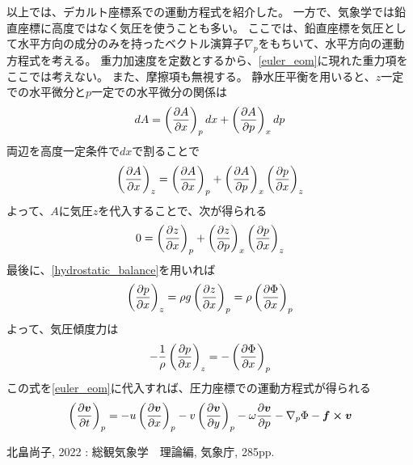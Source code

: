 \documentclass[a4paper,11pt,platex]{jsarticle}
\numberwithin{equation}{section}
\newcommand{\spartial}[2]{{\partial #1 \over \partial #2}}
\begin{document}
以上では、デカルト座標系での運動方程式を紹介した。
一方で、気象学では鉛直座標に高度ではなく気圧を使うことも多い。
ここでは、鉛直座標を気圧として水平方向の成分のみを持ったベクトル演算子$\nabla_p$をもちいて、水平方向の運動方程式を考える。
重力加速度を定数とするから、\autoref{euler_eom}に現れた重力項をここでは考えない。
また、摩擦項も無視する。
静水圧平衡を用いると、$z$一定での水平微分と$p$一定での水平微分の関係は
\begin{equation}
    dA = \left(\spartial{A}{x}\right)_p dx + \left(\spartial{A}{p}\right)_x dp
\end{equation}
両辺を高度一定条件で$dx$で割ることで
\begin{equation}
    \label{A_z_p_conversion}
    \left(\spartial{A}{x}\right)_z = \left(\spartial{A}{x}\right)_p + \left(\spartial{A}{p}\right)_x \left(\spartial{p}{x}\right)_z
\end{equation}
よって、$A$に気圧$z$を代入することで、次が得られる
\begin{equation}
    0 = \left(\spartial{z}{x}\right)_p + \left(\spartial{z}{p}\right)_x \left(\spartial{p}{x}\right)_z
\end{equation}
最後に、\autoref{hydrostatic_balance}を用いれば
\begin{equation}
    \left(\spartial{p}{x}\right)_z = \rho g \left(\spartial{z}{x}\right)_p = \rho \left(\spartial{\Phi}{x}\right)_p
\end{equation}
よって、気圧傾度力は
\begin{equation}
    -{1 \over \rho}\left(\spartial{p}{x}\right)_z = -\left(\spartial{\Phi}{x}\right)_p
\end{equation}
この式を\autoref{euler_eom}に代入すれば、圧力座標での運動方程式が得られる
\begin{equation}
    \left(\spartial{\vb*{v}}{t}\right)_p = -u\left(\spartial{\vb*{v}}{x}\right)_p - v\left(\spartial{\vb*{v}}{y}\right)_p - \omega\spartial{\vb*{v}}{p} - \nabla_p \Phi- \vb*{f} \cross \vb*{v}
\end{equation}










\clearpage

\begin{thebibliography}{100}
    \item 北畠尚子, 2022 : 総観気象学　理論編, 気象庁, 285pp.
\end{thebibliography}
\end{document}
